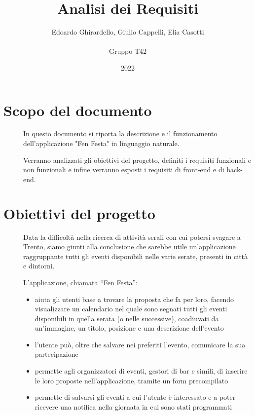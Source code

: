 \documentclass{article}
\title{\textbf{\Huge Analisi dei Requisiti}}
\author{Edoardo Ghirardello, Giulio Cappelli, Elia Casotti \\ \\ Gruppo T42}
\date{2022}
\begin{document}
\maketitle

\clearpage
\tableofcontents
\clearpage

\section{Scopo del documento}
\begin{description}
    \item[] In questo documento si riporta la descrizione e il funzionamento dell'applicazione "Fen Festa" in linguaggio naturale.
    \item[] Verranno analizzati gli obiettivi del progetto, definiti i requisiti funzionali e non funzionali e infine verranno esposti i requisiti di front-end e di back-end.
\end{description}
\clearpage
\section{Obiettivi del progetto}
\begin{description}
    \item[] Data la difficoltà nella ricerca di attività serali con cui potersi svagare a Trento, siamo giunti alla conclusione che sarebbe utile un’applicazione raggruppante tutti gli eventi disponibili nelle varie serate, presenti in città e dintorni.
    \item[] L’applicazione, chiamata “Fen Festa”:
        \begin{itemize}
            \item aiuta gli utenti base a trovare la proposta che fa per loro, facendo visualizzare un calendario nel quale sono segnati tutti gli eventi disponibili in quella serata (o nelle successive), coadiuvati da un’immagine, un titolo, posizione e una descrizione dell’evento
            \item l’utente può, oltre che salvare nei preferiti l’evento, comunicare la sua partecipazione
            \item permette agli organizzatori di eventi, gestori di bar e simili, di inserire le loro proposte nell’applicazione, tramite un form precompilato
            \item permette di salvarsi gli eventi a cui l’utente è interessato e a poter ricevere una notifica nella giornata in cui sono stati programmati
        \end{itemize}
\end{description}
\clearpage
\end{document}

